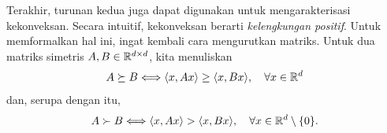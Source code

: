 Terakhir, turunan kedua juga dapat digunakan untuk mengarakterisasi kekonveksan. Secara intuitif, kekonveksan berarti \emph{kelengkungan positif}. Untuk memformalkan hal ini, ingat kembali cara mengurutkan matriks. Untuk dua matriks simetris $A,B\in\mathbb{R}^{d\times d}$, kita menuliskan
\begin{equation}
    A\succeq B\Longleftrightarrow\langle x,Ax\rangle\geq\langle x,Bx\rangle,\quad\forall x\in\mathbb{R}^d
\end{equation}
dan, serupa dengan itu,
\begin{equation}
    A\succ B\Longleftrightarrow\langle x,Ax\rangle>\langle x,Bx\rangle,\quad\forall x\in\mathbb{R}^d\setminus\{0\}.
\end{equation}

